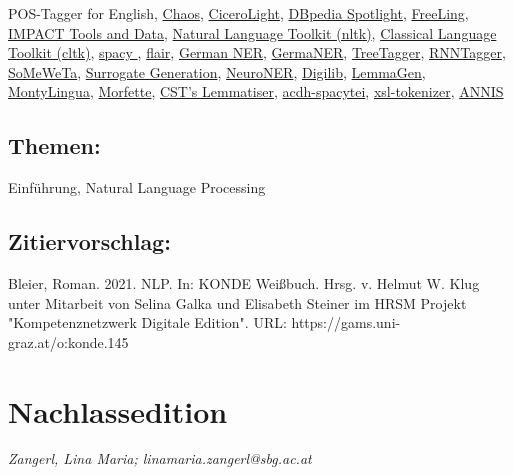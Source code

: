 \documentclass{article}
\begin{document}
{                           POS-Tagger for English}, \href{http://art.uniroma2.it/external/chaosproject/}{Chaos}, \href{http://www.languagecomputer.com/}{CiceroLight}, \href{https://github.com/dbpedia-spotlight/dbpedia-spotlight/wiki}{DBpedia Spotlight}, \href{http://www.talp.upc.edu/}{FreeLing}, \href{https://www.digitisation.eu}{IMPACT Tools and
                           Data}, \href{https://www.nltk.org/}{Natural Language Toolkit
                           (nltk)}, \href{http://cltk.org/}{Classical Language Toolkit
                           (cltk)}, \href{https://spacy.io/}{spacy }, \href{https://github.com/zalandoresearch/flair}{flair}, \href{https://www.ims.uni-stuttgart.de/forschung/ressourcen/werkzeuge/german-ner/}{German NER}, \href{https://github.com/tudarmstadt-lt/GermaNER}{GermaNER}, \href{https://www.cis.uni-muenchen.de/~schmid/tools/TreeTagger/}{TreeTagger}, \href{https://www.cis.uni-muenchen.de/~schmid/tools/RNNTagger/}{RNNTagger}, \href{https://github.com/tsproisl/SoMeWeTa}{SoMeWeTa}, \href{https://github.com/ee-2/SurrogateGeneration}{Surrogate Generation}, \href{http://neuroner.com/}{NeuroNER}, \href{https://robcast.github.io/digilib/}{Digilib}, \href{http://lemmatise.ijs.si/}{LemmaGen}, \href{http://alumni.media.mit.edu/~hugo/montylingua/index.html}{MontyLingua}, \href{https://sites.google.com/site/morfetteweb/}{Morfette}, \href{https://cst.dk/online/lemmatiser/uk/}{CST's
                           Lemmatiser}, \href{https://github.com/acdh-oeaw/acdh-spacytei}{acdh-spacytei}, \href{https://github.com/acdh-oeaw/xsl-tokenizer}{xsl-tokenizer}, \href{http://corpus-tools.org/annis/}{ANNIS}\subsection*{Themen:}Einführung, Natural Language Processing\subsection*{Zitiervorschlag:}Bleier, Roman. 2021. NLP. In: KONDE Weißbuch. Hrsg. v. Helmut W. Klug unter Mitarbeit von Selina Galka und Elisabeth Steiner im HRSM Projekt "Kompetenznetzwerk Digitale Edition". URL: https://gams.uni-graz.at/o:konde.145\newpage\section*{Nachlassedition} \emph{Zangerl, Lina Maria; linamaria.zangerl@sbg.ac.at }\\
        
\end{document}
